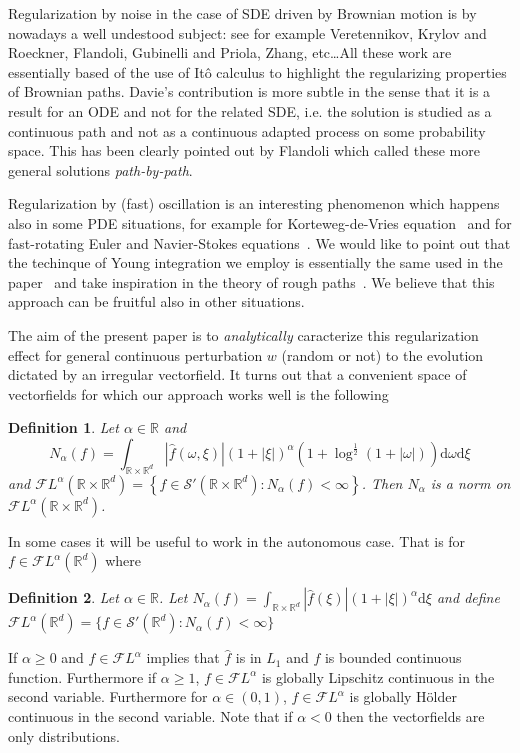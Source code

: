 \documentclass[11pt,a4paper,draft,reqno]{amsart}
\newtheorem{definition}{Definition}
\theoremstyle{definition}
\newcommand{\RR}{\mathbb{R}}
\newcommand{\cF}{\mathcal{F}}
\newcommand{\dd}{\mathrm{d}}
\newcommand{\cS}{\mathcal{S}}
\begin{document}
Regularization by noise in the case of SDE driven by Brownian motion is by nowadays a well undestood subject: see for example
Veretennikov, Krylov and Roeckner, Flandoli, Gubinelli and Priola, Zhang, etc\dots All these work are essentially based of the
use of It\^o calculus to highlight the regularizing properties of Brownian paths. Davie's contribution is more subtle in the
sense that it is a result for an ODE and not for the related SDE, i.e. the solution is studied as a continuous path and not as a
continuous adapted process on some probability space. This has been clearly pointed out by Flandoli which called these more
general solutions \emph{path-by-path}.

\bigskip

Regularization by (fast) oscillation is an interesting phenomenon which happens also in some PDE situations, for example for Korteweg-de-Vries equation~\cites{kdv,BIT} and for fast-rotating Euler and Navier-Stokes equations~\cite{BMN}.  We would like to point out that the techinque of Young integration we employ is essentially the same used in the paper~\cite{kdv} and take inspiration in the theory of rough paths~\cites{Lyons, Controlling, FV}. We believe that this approach can be fruitful also in other situations.

\bigskip

The aim of the present paper is to \emph{analytically} caracterize this regularization effect for general continuous perturbation $w$ (random or not) to the evolution dictated by an irregular vectorfield. 
It turns out that a  convenient space of vectorfields for which our approach works  well is the following
\begin{definition}
Let $\alpha \in \RR$ and
\begin{equation*}
N_{\alpha}(f) = \int_{\RR\times\RR^d} |\hat{f}(\omega,\xi)|\left(1+|\xi|\right)^{\alpha}(1+\log^{\frac12}(1+|\omega|))\dd \omega\dd \xi  
\end{equation*}
and
$\cF L^{\alpha}(\RR\times\RR^d) = \left\{ f \in\cS'(\RR\times\RR^d) : N_\alpha(f) <\infty \right\}$.
Then $N_\alpha$ is  a norm on $\cF L^\alpha(\RR\times\RR^d)$.
\end{definition}
In some cases it will be useful to work in the autonomous case. That is for $f\in\cF L^{\alpha}(\RR^d)$ where
\begin{definition}
Let $\alpha \in \RR$. Let 
$N_{\alpha}(f) = \int_{\RR\times\RR^d} |\hat{f}(\xi)|(1+|\xi|)^{\alpha}\dd \xi$
and define
$\cF L^{\alpha}(\RR^d) = \{ f \in\cS'(\RR^d) :N_\alpha(f) <\infty\}$
\end{definition}
If $\alpha\ge0$ and $f\in\cF L^{\alpha}$ implies that $\hat f$ is in $L_1$ and $f$ is bounded continuous function. Furthermore if $\alpha\ge1$, $f\in\cF L^\alpha$ is globally Lipschitz continuous in the second variable. Furthermore for $\alpha\in(0,1)$, $f\in\cF L^\alpha$ is globally H\"older continuous in the second variable. 
Note that if $\alpha < 0$ then the vectorfields are only distributions. 
\end{document}
